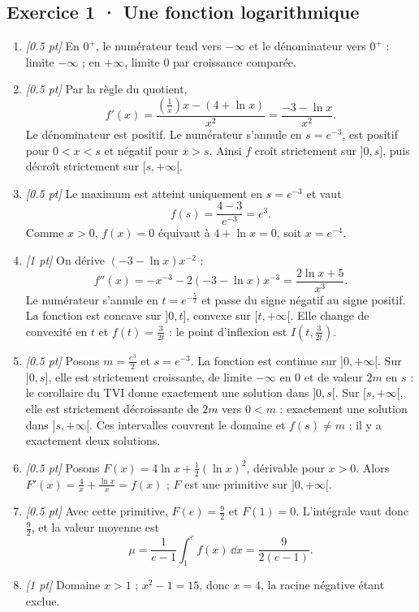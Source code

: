 \subsection*{Exercice 1 · Une fonction logarithmique}\begin{enumerate}

\item \textit{[\num{0,5} pt]} En $0^+$, le numérateur tend vers $-\infty$ et le dénominateur vers $0^+$ : limite $-\infty$ ; en $+\infty$, limite $0$ par croissance comparée.

\item \textit{[\num{0,5} pt]} Par la règle du quotient,
\[f'(x)=\frac{(\frac{1}{x})x-(4+\ln x)}{x^2}=\frac{-3-\ln x}{x^2}.\]
Le dénominateur est positif. Le numérateur s'annule en $s=e^{-3}$, est positif pour $0<x<s$ et négatif pour $x>s$. Ainsi $f$ croît strictement sur $]0,s]$, puis décroît strictement sur $[s,+\infty[$.

\item \textit{[\num{0,5} pt]} Le maximum est atteint uniquement en $s=e^{-3}$ et vaut
\[f(s)=\frac{4- 3}{e^{-3}}=e^{3}.\]
Comme $x>0$, $f(x)=0$ équivaut à $4+\ln x=0$, soit $x=e^{-4}$.

\item \textit{[1 pt]} On dérive $(-3-\ln x)x^{-2}$ :
\[f''(x)=-x^{-3}-2(-3-\ln x)x^{-3}=\frac{2\ln x+5}{x^3}.\]
Le numérateur s'annule en $t=e^{-\frac{5}{2}}$ et passe du signe négatif au signe positif. La fonction est concave sur $]0,t]$, convexe sur $[t,+\infty[$. Elle change de convexité en $t$ et $f(t)=\frac{3}{2t}$ : le point d'inflexion est $I(t,\frac{3}{2t})$.

\item \textit{[\num{0,5} pt]} Posons $m=\frac{e^{3}}{2}$ et $s=e^{-3}$. La fonction est continue sur $]0,+\infty[$. Sur $]0,s]$, elle est strictement croissante, de limite $-\infty$ en $0$ et de valeur $2m$ en $s$ : le corollaire du TVI donne exactement une solution dans $]0,s[$. Sur $[s,+\infty[$, elle est strictement décroissante de $2m$ vers $0<m$ : exactement une solution dans $]s,+\infty[$. Ces intervalles couvrent le domaine et $f(s)\ne m$ : il y a exactement deux solutions.

\item \textit{[\num{0,5} pt]} Posons $F(x)=4\ln x+\frac12(\ln x)^2$, dérivable pour $x>0$. Alors $F'(x)=\frac{4}{x}+\frac{\ln x}{x}=f(x)$ ; $F$ est une primitive sur $]0,+\infty[$.

\item \textit{[\num{0,5} pt]} Avec cette primitive, $F(e)=\frac{9}{2}$ et $F(1)=0$. L'intégrale vaut donc $\frac{9}{2}$, et la valeur moyenne est
\[\mu=\frac{1}{e-1}\int_1^e f(x)\,\dd x=\frac{9}{2(e-1)}.\]

\item \textit{[1 pt]} Domaine $x>1$ ; $x^2-1=15$, donc $x=4$, la racine négative étant exclue.

\end{enumerate}

